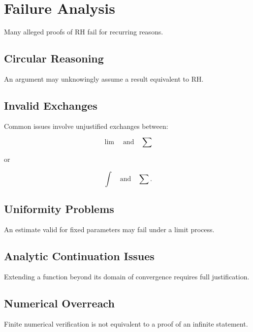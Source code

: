 \section{Failure Analysis}

Many alleged proofs of RH fail for recurring reasons.

\subsection{Circular Reasoning}

An argument may unknowingly assume a result equivalent to RH.

\subsection{Invalid Exchanges}

Common issues involve unjustified exchanges between:

\[
\lim
\quad\text{and}\quad
\sum
\]

or

\[
\int
\quad\text{and}\quad
\sum.
\]

\subsection{Uniformity Problems}

An estimate valid for fixed parameters may fail under a limit process.

\subsection{Analytic Continuation Issues}

Extending a function beyond its domain of convergence requires full justification.

\subsection{Numerical Overreach}

Finite numerical verification is not equivalent to a proof of an infinite statement.